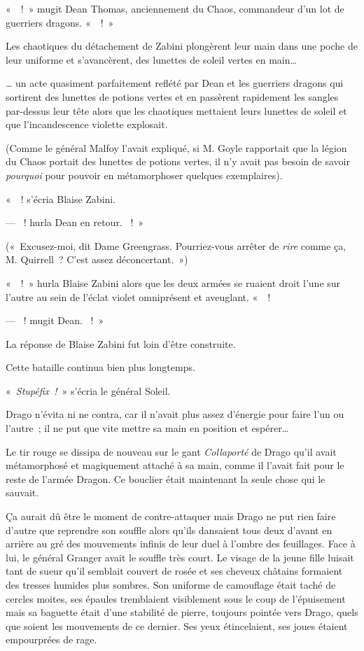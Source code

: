 «~~!~» mugit Dean Thomas, anciennement du Chaos, commandeur d'un lot de guerriers dragons. «~~!~»

Les chaotiques du détachement de Zabini plongèrent leur main dans une poche de leur uniforme et s'avancèrent, des lunettes de soleil vertes en main…

… un acte quasiment parfaitement reflété par Dean et les guerriers dragons qui sortirent des lunettes de potions vertes et en passèrent rapidement les sangles par-dessus leur tête alors que les chaotiques mettaient leurs lunettes de soleil et que l'incandescence violette explosait.

(Comme le général Malfoy l'avait expliqué, si M. Goyle rapportait que la légion du Chaos portait des lunettes de potions vertes, il n'y avait pas besoin de savoir \emph{pourquoi} pour pouvoir en métamorphoser quelques exemplaires).

«~~! s'écria Blaise Zabini.

--- ~! hurla Dean en retour. ~!~»

(«~Excusez-moi, dit Dame Greengrass. Pourriez-vous arrêter de \emph{rire} comme ça, M. Quirrell~? C'est assez déconcertant.~»)

«~~!~» hurla Blaise Zabini alors que les deux armées se ruaient droit l'une sur l'autre au sein de l'éclat violet omniprésent et aveuglant. «~~!

--- ~! mugit Dean. ~!~»

La réponse de Blaise Zabini fut loin d'être construite.

Cette bataille continua bien plus longtemps.

\later

«~\emph{Stupéfix~!}~» s'écria le général Soleil.

Drago n'évita ni ne contra, car il n'avait plus assez d'énergie pour faire l'un ou l'autre~; il ne put que vite mettre sa main en position et espérer…

Le tir rouge se dissipa de nouveau sur le gant \emph{Collaporté} de Drago qu'il avait métamorphosé et magiquement attaché à sa main, comme il l'avait fait pour le reste de l'armée Dragon. Ce bouclier était maintenant la seule chose qui le sauvait.

Ça aurait dû être le moment de contre-attaquer mais Drago ne put rien faire d'autre que reprendre son souffle alors qu'ils dansaient tous deux d'avant en arrière au gré des mouvements infinis de leur duel à l'ombre des feuillages. Face à lui, le général Granger avait le souffle très court. Le visage de la jeune fille luisait tant de sueur qu'il semblait couvert de rosée et ses cheveux châtains formaient des tresses humides plus sombres. Son uniforme de camouflage était taché de cercles moites, ses épaules tremblaient visiblement sous le coup de l'épuisement mais sa baguette était d'une stabilité de pierre, toujours pointée vers Drago, quels que soient les mouvements de ce dernier. Ses yeux étincelaient, ses joues étaient empourprées de rage.


